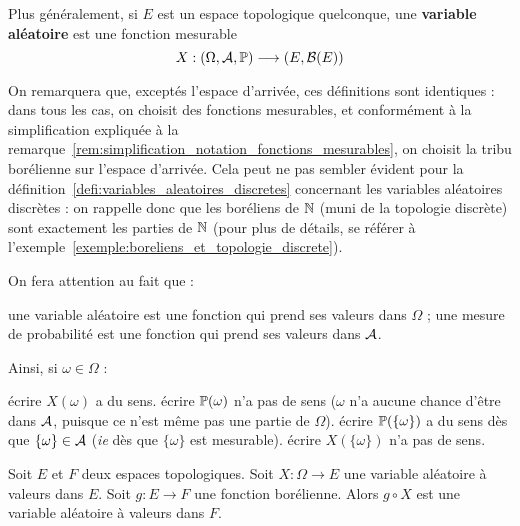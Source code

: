 \documentclass[../integ-proba.tex]{subfiles}
\begin{document}
    \begin{defi}
        Plus généralement, si $E$ est un espace topologique quelconque, une \textbf{variable aléatoire} est une fonction mesurable
        \begin{displaymath}
          X:\left(\Omega, \mathcal{A}, \mathbb{P}\right) \longrightarrow \left(E, \mathcal{B}(E)\right)
        \end{displaymath}
    \end{defi}

    \begin{rem}
        On remarquera que, exceptés l'espace d'arrivée, ces définitions sont identiques : dans tous les cas, on choisit des fonctions mesurables, et conformément à la simplification expliquée à la remarque~\ref{rem:simplification_notation_fonctions_mesurables}, on choisit la tribu borélienne sur l'espace d'arrivée.
        Cela peut ne pas sembler évident pour la définition~\ref{defi:variables_aleatoires_discretes} concernant les variables aléatoires discrètes : on rappelle donc que les boréliens de $\mathbb{N}$ (muni de la topologie discrète) sont exactement les parties de $\mathbb{N}$ (pour plus de détails, se référer à l'exemple~\ref{exemple:boreliens_et_topologie_discrete}).
    \end{rem}

    \begin{rem}
        On fera attention au fait que :
        \begin{itemize}
            \itemb une variable aléatoire est une fonction qui prend ses valeurs dans $\Omega$ ;
            \itemb une mesure de probabilité est une fonction qui prend ses valeurs dans $\mathcal{A}$.
        \end{itemize}
        Ainsi, si $\omega \in \Omega$ :
        \begin{itemize}
            \itemb écrire $X(\omega)$ a du sens.
            \itemb écrire $\mathbb{P}(\omega)$ n'a pas de sens ($\omega$ n'a aucune chance d'être dans $\mathcal{A}$, puisque ce n'est même pas une partie de $\Omega$).
            \itemb écrire $\mathbb{P}(\{\omega\})$ a du sens dès que $\{\omega\}\in \mathcal{A}$ (\textit{ie} dès que $\{\omega\}$ est mesurable).
            \itemb écrire $X(\{\omega\})$ n'a pas de sens.
        \end{itemize}
    \end{rem}

    \begin{prop}
        \label{prop:composition_var_bor}
        Soit $E$ et $F$ deux espaces topologiques.
        Soit $X:\Omega \longrightarrow E$ une variable aléatoire à valeurs dans $E$.
        Soit $g:E \longrightarrow F$ une fonction borélienne.
        Alors $g \circ X$ est une variable aléatoire à valeurs dans $F$.
    \end{prop}
\end{document}
